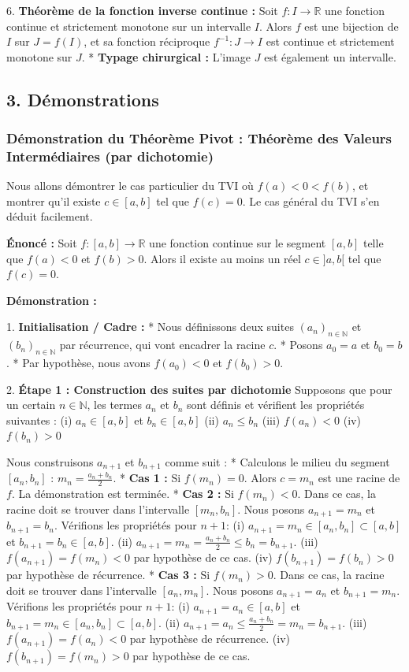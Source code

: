 \documentclass[12pt,a4paper]{report}
\begin{document}
6.  \textbf{Théorème de la fonction inverse continue :}
    Soit $f : I \to \mathbb{R}$ une fonction continue et strictement monotone sur un intervalle $I$. Alors $f$ est une bijection de $I$ sur $J = f(I)$, et sa fonction réciproque $f^{-1} : J \to I$ est continue et strictement monotone sur $J$.
    *   \textbf{Typage chirurgical :} L'image $J$ est également un intervalle.

\subsection{3. Démonstrations}
\subsubsection{Démonstration du Théorème Pivot : Théorème des Valeurs Intermédiaires (par dichotomie)}
Nous allons démontrer le cas particulier du TVI où $f(a) < 0 < f(b)$, et montrer qu'il existe $c \in [a, b]$ tel que $f(c) = 0$. Le cas général du TVI s'en déduit facilement.

\textbf{Énoncé :} Soit $f : [a, b] \to \mathbb{R}$ une fonction continue sur le segment $[a, b]$ telle que $f(a) < 0$ et $f(b) > 0$. Alors il existe au moins un réel $c \in ]a, b[$ tel que $f(c) = 0$.

\textbf{Démonstration :}

1.  \textbf{Initialisation / Cadre :}
    *   Nous définissons deux suites $(a_n)_{n \in \mathbb{N}}$ et $(b_n)_{n \in \mathbb{N}}$ par récurrence, qui vont encadrer la racine $c$.
    *   Posons $a_0 = a$ et $b_0 = b$.
    *   Par hypothèse, nous avons $f(a_0) < 0$ et $f(b_0) > 0$.

2.  \textbf{Étape 1 : Construction des suites par dichotomie}
    Supposons que pour un certain $n \in \mathbb{N}$, les termes $a_n$ et $b_n$ sont définis et vérifient les propriétés suivantes :
    (i) $a_n \in [a, b]$ et $b_n \in [a, b]$
    (ii) $a_n \le b_n$
    (iii) $f(a_n) < 0$
    (iv) $f(b_n) > 0$

    Nous construisons $a_{n+1}$ et $b_{n+1}$ comme suit :
    *   Calculons le milieu du segment $[a_n, b_n]$ : $m_n = \frac{a_n + b_n}{2}$.
    *   \textbf{Cas 1 :} Si $f(m_n) = 0$.
        Alors $c = m_n$ est une racine de $f$. La démonstration est terminée.
    *   \textbf{Cas 2 :} Si $f(m_n) < 0$.
        Dans ce cas, la racine doit se trouver dans l'intervalle $[m_n, b_n]$.
        Nous posons $a_{n+1} = m_n$ et $b_{n+1} = b_n$.
        Vérifions les propriétés pour $n+1$:
        (i) $a_{n+1} = m_n \in [a_n, b_n] \subset [a, b]$ et $b_{n+1} = b_n \in [a, b]$.
        (ii) $a_{n+1} = m_n = \frac{a_n+b_n}{2} \le b_n = b_{n+1}$.
        (iii) $f(a_{n+1}) = f(m_n) < 0$ par hypothèse de ce cas.
        (iv) $f(b_{n+1}) = f(b_n) > 0$ par hypothèse de récurrence.
    *   \textbf{Cas 3 :} Si $f(m_n) > 0$.
        Dans ce cas, la racine doit se trouver dans l'intervalle $[a_n, m_n]$.
        Nous posons $a_{n+1} = a_n$ et $b_{n+1} = m_n$.
        Vérifions les propriétés pour $n+1$:
        (i) $a_{n+1} = a_n \in [a, b]$ et $b_{n+1} = m_n \in [a_n, b_n] \subset [a, b]$.
        (ii) $a_{n+1} = a_n \le \frac{a_n+b_n}{2} = m_n = b_{n+1}$.
        (iii) $f(a_{n+1}) = f(a_n) < 0$ par hypothèse de récurrence.
        (iv) $f(b_{n+1}) = f(m_n) > 0$ par hypothèse de ce cas.
\end{document}
